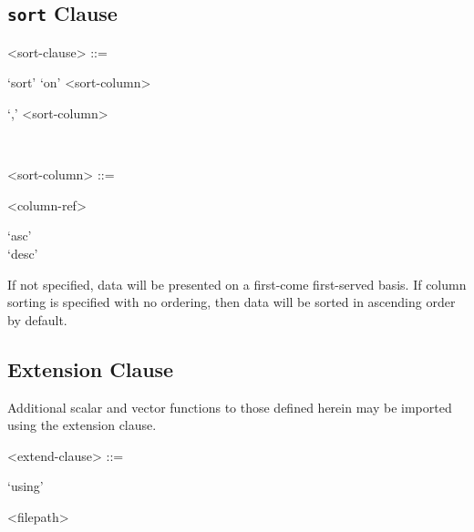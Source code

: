 \subsection{\texttt{sort} Clause}

\begin{grammar}
  <sort-clause> ::= \begin{syntdiag}
    `sort' `on'
    <sort-column>
    \begin{stack}
      \begin{rep}`,' <sort-column>\end{rep} \\
    \end{stack}
  \end{syntdiag}

  <sort-column> ::= \begin{syntdiag}
    <column-ref>
    \begin{stack}
      `asc' \\
      `desc' \\
    \end{stack}
  \end{syntdiag}
\end{grammar}

If not specified, data will be presented on a first-come first-served
basis. If column sorting is specified with no ordering, then data will
be sorted in ascending order by default.


\subsection{Extension Clause}

Additional scalar and vector functions to those defined herein may be
imported using the extension clause.

\begin{grammar}
  <extend-clause> ::= \begin{syntdiag}
    `using'
    \begin{rep}
      <filepath>
    \end{rep}
  \end{syntdiag}
\end{grammar}
